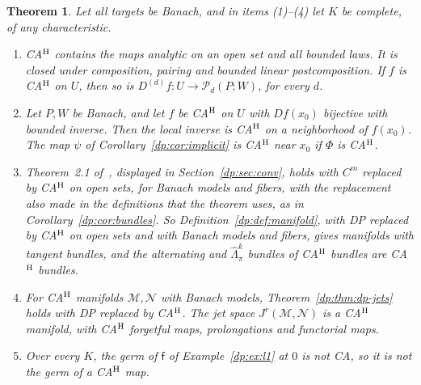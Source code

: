 \documentclass[11pt]{amsart}
\newtheorem{theorem}{Theorem}[section]
\theoremstyle{definition}
\theoremstyle{remark}
\numberwithin{equation}{section}
\theoremstyle{plain}
\theoremstyle{definition}
\theoremstyle{plain}
\newcommand{\cP}{\mathcal P}
\begin{document}
\begin{theorem}\label{dp:thm:cah}
Let all targets be Banach, and in items \textup{(1)--(4)} let $K$ be complete, of any characteristic.
\begin{enumerate}
\item CA$^{\rm H}$ contains the maps analytic on an open set and all bounded laws. It is closed under composition, pairing and bounded linear postcomposition. If $f$ is CA$^{\rm H}$ on $U$, then so is $D^{(d)}f\colon U\to\cP_d(P;W)$, for every $d$.
\item Let $P,W$ be Banach, and let $f$ be CA$^{\rm H}$ on $U$ with $Df(x_0)$ bijective with bounded inverse. Then the local inverse is CA$^{\rm H}$ on a neighborhood of $f(x_0)$. The map $\psi$ of Corollary~\ref{dp:cor:implicit} is CA$^{\rm H}$ near $x_0$ if $\Phi$ is CA$^{\rm H}$.
\item Theorem~2.1 of~\cite{I}, displayed in Section~\ref{dp:sec:conv}, holds with $C^m$ replaced by CA$^{\rm H}$ on open sets, for Banach models and fibers, with the replacement also made in the definitions that the theorem uses, as in Corollary~\ref{dp:cor:bundles}. So Definition~\ref{dp:def:manifold}, with DP replaced by CA$^{\rm H}$ on open sets and with Banach models and fibers, gives manifolds with tangent bundles, and the alternating and $\widehat\Lambda^k_\pi$ bundles of CA$^{\rm H}$ bundles are CA$^{\rm H}$ bundles.
\item For CA$^{\rm H}$ manifolds $\mathcal M,\mathcal N$ with Banach models, Theorem~\ref{dp:thm:dp-jets} holds with DP replaced by CA$^{\rm H}$. The jet space $J^r(\mathcal M,\mathcal N)$ is a CA$^{\rm H}$ manifold, with CA$^{\rm H}$ forgetful maps, prolongations and functorial maps.
\item Over every $K$, the germ of $\mathsf f$ of Example~\ref{dp:ex:l1} at $0$ is not CA, so it is not the germ of a CA$^{\rm H}$ map.
\end{enumerate}
\end{theorem}
\end{document}
